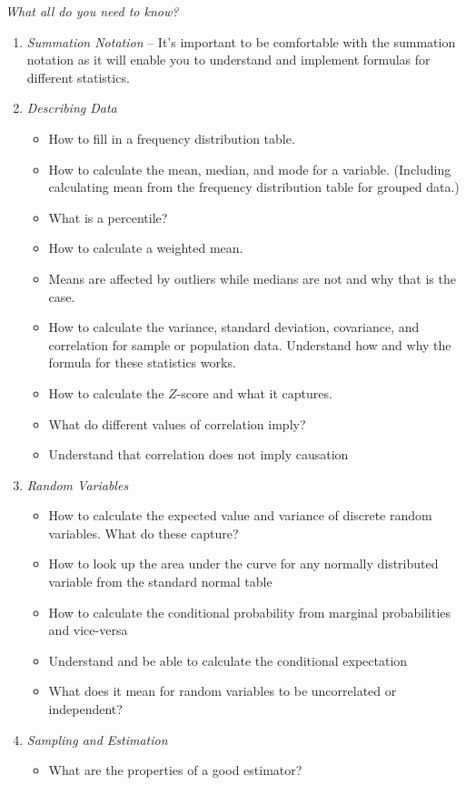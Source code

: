 \documentclass{./../../Latex/handout}
\begin{document}
\newpage
 \textit{What all do you need to know?}
\begin{enumerate}
\item \textit{Summation Notation} -- It's important to be comfortable with the summation notation as it will enable you to understand and implement formulas for different statistics. 
\item \textit{Describing Data}  
\begin{itemize}
\item How to fill in a frequency distribution table.
\item How to calculate the mean, median, and mode for a variable. (Including calculating mean from the frequency distribution table for grouped data.)
\item What is a percentile?
\item How to calculate a weighted mean. 
\item Means are affected by outliers while medians are not and why that is the case.
\item How to calculate the variance, standard deviation, covariance, and correlation for sample or population data. Understand how and why the formula for these statistics works. 
\item How to calculate the $Z$-score and what it captures.
\item What do different values of correlation imply? 
\item Understand that correlation does not imply causation 
\end{itemize}
\item \textit{Random Variables} 
\begin{itemize}
\item How to calculate the expected value and variance of discrete random variables. What do these capture?
\item How to look up the area under the curve for any normally distributed variable from the standard normal table
\item How to calculate the conditional probability from marginal probabilities and vice-versa
\item Understand and be able to calculate the conditional expectation 
\item What does it mean for random variables to be uncorrelated or independent?
\end{itemize}
\newpage
\item \textit{Sampling and Estimation} 
\begin{itemize}
\item What are the properties of a good estimator?

\end{itemize}
\end{enumerate}
\end{document}
